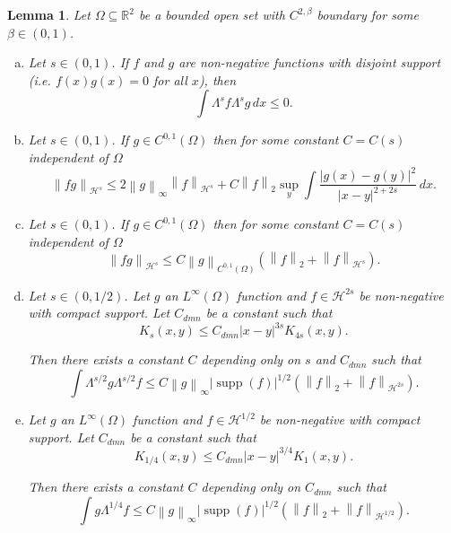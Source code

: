 \documentclass[11pt]{amsart}
\newtheorem{lemma}[theorem]{Lemma}
\theoremstyle{remark}
\theoremstyle{definition}
\newcommand{\R}{\mathbb{R}}
\newcommand{\norm}[1]{\left\lVert#1\right\rVert}
\newcommand{\paren}[1]{\left( #1 \right)}
\DeclareMathOperator{\supp}{supp}
\newcommand{\HD}{\mathcal{H}}
\newcommand{\Comega}{C_\mathit{dmn}}
\begin{document}
\begin{lemma} \label{thm:Lambda stuff}
Let $\Omega \subseteq \R^2$ be a bounded open set with $C^{2,\beta}$ boundary for some $\beta \in (0,1)$.  

\begin{enumerate}[(a)]
\item \label{thm:disjoint} Let $s \in (0,1)$.  If $f$ and $g$ are non-negative functions with disjoint support (i.e. $f(x)g(x) = 0$ for all $x$), then 
\[ \int \Lambda^s f \Lambda^s g \,dx \leq 0. \]

\item \label{thm:product rule} Let $s \in (0,1)$.  If $g \in C^{0,1}(\Omega)$ then for some constant $C = C(s)$ independent of $\Omega$
\[ \norm{fg}_{\HD^s} \leq 2 \norm{g}_\infty \norm{f}_{\HD^s} + C \norm{f}_2 \sup_y \int \frac{|g(x)-g(y)|^2}{|x-y|^{2+2s}} \,dx. \]

\item \label{thm:extra product rule} Let $s \in (0,1)$.  If $g \in C^{0,1}(\Omega)$ then for some constant $C=C(s)$ independent of $\Omega$
\[  \norm{fg}_{\HD^s} \leq C \norm{g}_{C^{0,1}(\Omega)} \paren{\norm{f}_2 + \norm{f}_{\HD^s}}. \]

\item \label{thm:L1 of Lambda bounded} Let $s\in(0,1/2)$.  Let $g$ an $L^\infty(\Omega)$ function and $f \in \HD^{2s}$ be non-negative with compact support.  Let $\Comega$ be a constant such that
\begin{equation} \label{K bounded between orders} K_s(x,y) \leq \Comega |x-y|^{3s} K_{4s}(x,y). \end{equation}

Then there exists a constant $C$ depending only on $s$ and $\Comega$ such that
\[ \int \Lambda^{s/2} g \Lambda^{s/2} f \leq C \norm{g}_\infty |\supp(f)|^{1/2} \paren{ \norm{f}_2 + \norm{f}_{\HD^{2s}}}. \]

\item \label{thm:L1 of Lambda1/4 bounded} Let $g$ an $L^\infty(\Omega)$ function and $f \in \HD^{1/2}$ be non-negative with compact support.  Let $\Comega$ be a constant such that
\[ K_{1/4}(x,y) \leq \Comega |x-y|^{3/4} K_{1}(x,y). \]

Then there exists a constant $C$ depending only on $\Comega$ such that
\[ \int g \Lambda^{1/4} f \leq C \norm{g}_\infty |\supp(f)|^{1/2} \paren{ \norm{f}_2 + \norm{f}_{\HD^{1/2}}}. \]

\end{enumerate}
\end{lemma}
\end{document}
